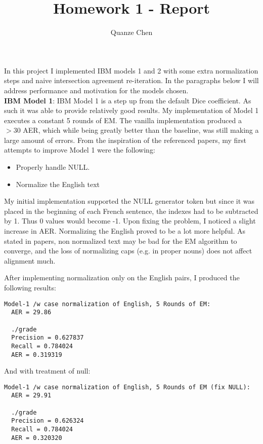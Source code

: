 \documentclass{article}
\title{Homework 1 - Report}
\author{Quanze Chen}
\begin{document}
\thispagestyle{plain}\maketitle

In this project I implemented IBM models 1 and 2 with some extra normalization steps and naive intersection agreement re-iteration. In the paragraphs below I will address performance and motivation for the models chosen.\\

{\bf IBM Model 1}: IBM Model 1 is a step up from the default Dice coefficient. As such it was able to provide relatively good results. My implementation of Model 1 executes a constant 5 rounds of EM. The vanilla implementation produced a $>30$ AER, which while being greatly better than the baseline, was still making a large amount of errors. From the inspiration of the referenced papers, my first attempts to improve Model 1 were the following:

\begin{itemize}
\item Properly handle NULL.
\item Normalize the English text
\end{itemize}

My initial implementation supported the NULL generator token but since it was placed in the beginning of each French sentence, the indexes had to be subtracted by 1. Thus 0 values would become -1. Upon fixing the problem, I noticed a slight increase in AER. Normalizing the English proved to be a lot more helpful. As stated in papers, non normalized text may be bad for the EM algorithm to converge, and the loss of normalizing caps (e.g. in proper nouns) does not affect alignment much.

After implementing normalization only on the English pairs, I produced the following results:

\begin{verbatim}
Model-1 /w case normalization of English, 5 Rounds of EM:
  AER = 29.86 
  
  ./grade
  Precision = 0.627837
  Recall = 0.784024
  AER = 0.319319
\end{verbatim}

And with treatment of null:
\begin{verbatim}
Model-1 /w case normalization of English, 5 Rounds of EM (fix NULL):
  AER = 29.91

  ./grade
  Precision = 0.626324
  Recall = 0.784024
  AER = 0.320320
\end{verbatim}
\end{document}
